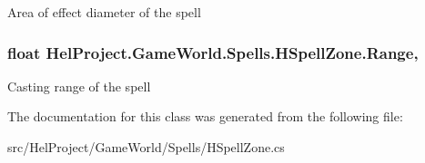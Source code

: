 Area of effect diameter of the spell 

\hypertarget{class_hel_project_1_1_game_world_1_1_spells_1_1_h_spell_zone_ad3b44aced22248c0aaf4b63e5c62e491}{}
\subsubsection[{Range}]{\setlength{\rightskip}{0pt plus 5cm}float Hel\+Project.\+Game\+World.\+Spells.\+H\+Spell\+Zone.\+Range\hspace{0.3cm}{\ttfamily [get]}, {\ttfamily [set]}}\label{class_hel_project_1_1_game_world_1_1_spells_1_1_h_spell_zone_ad3b44aced22248c0aaf4b63e5c62e491}


Casting range of the spell 



The documentation for this class was generated from the following file\+:\begin{DoxyCompactItemize}
\item 
src/\+Hel\+Project/\+Game\+World/\+Spells/H\+Spell\+Zone.\+cs\end{DoxyCompactItemize}
